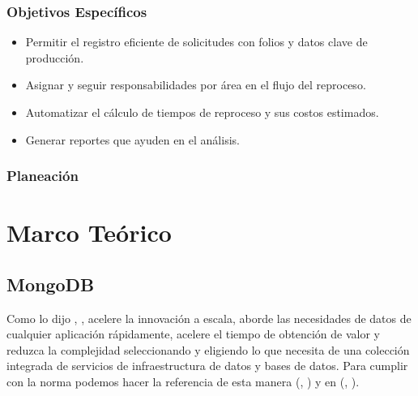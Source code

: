 \documentclass[12pt,letterpaper,spanish]{report}
\begin{document}
\subsection{Objetivos Específicos}
\begin{itemize}
\item Permitir el registro eficiente de solicitudes con folios y datos clave de producción.
\item Asignar y seguir responsabilidades por área en el flujo del reproceso.
\item Automatizar el cálculo de tiempos de reproceso y sus costos estimados.
\item Generar reportes que ayuden en el análisis.
\end{itemize}
\subsection{Planeación}




\chapter{Marco Teórico}
\newpage

\section{MongoDB}

Como lo dijo \citeauthor{ArBre}, \citeyear{ArBre}, acelere la innovación a escala, aborde las necesidades de datos de cualquier aplicación rápidamente, acelere el tiempo de obtención de valor y reduzca la complejidad seleccionando y eligiendo lo que necesita de una colección integrada de servicios de infraestructura de datos y bases de datos. Para cumplir con la norma podemos hacer la referencia de esta manera (\citeauthor{mongodb}, \citeyear{mongodb}) y en (\citeauthor{ArBre}, \citeyear{ArBre}).



\end{document}
